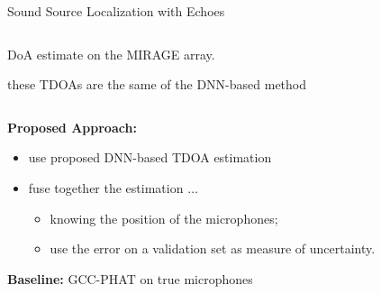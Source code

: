 \begin{frame}{Sound Source Localization \alert{with Echoes} \hfill\faMapMarked*}

    \vspace*{2mm}
    \begin{columns}[T,onlytextwidth]
    \begin{column}{0.5\textwidth}
        \begin{block}{}
            \begin{description}
                \small
                \item[Idea:] DoA estimate on the MIRAGE array.
                \item[Recall:] these TDOAs are the same of the DNN-based method
            \end{description}
        \end{block}

    \end{column}

    \begin{column}{0.5\textwidth}
        \centering
        \end{column}
    \end{columns}


    \vspace{2mm}
    \begin{mycontriblock}
        \textbf{Proposed Approach:}
        \begin{itemize}
            \item use proposed DNN-based TDOA estimation
            \item fuse together the estimation $\ldots$
            \begin{itemize}
                \item knowing the position of the microphones;
                \item use the error on a validation set as measure of uncertainty.
            \end{itemize}
        \end{itemize}
    \end{mycontriblock}

    \vspace{2mm}
    \begin{mysotablock}
        \textbf{Baseline:} GCC-PHAT on true microphones
    \end{mysotablock}

\end{frame}

